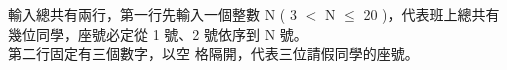 輸入總共有兩行，第一行先輸入一個整數 N ( 3 $<$ N $\leq$ 20 )，代表班上總共有 幾位同學，座號必定從 1 號、2 號依序到 N 號。\\
第二行固定有三個數字，以空 格隔開，代表三位請假同學的座號。\\
